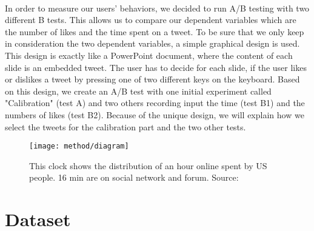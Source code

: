\paragraph{}
In order to measure our users' behaviors, we decided to run A/B testing with two different B tests. This allows us to compare our dependent variables which are the number of likes and the time spent on a tweet. To be sure that we only keep in consideration the two dependent variables, a simple graphical design is used. This design is exactly like a PowerPoint document, where the content of each slide is an embedded tweet. The user has to decide for each slide, if the user likes or dislikes a tweet by pressing one of two different keys on the keyboard. Based on this design, we create an A/B test with one initial experiment called "Calibration" (test A) and two others recording input the time (test B1) and the numbers of likes (test B2). Because of the unique design, we will explain how we select the tweets for the calibration part and the two other tests.\\

\begin{figure}[h] 
\centering 
\texttt{[image: method/diagram]} 
\caption[Time spent of Social Media]{This clock shows the distribution of an hour online spent by US people. 16 min are on social network and forum. Source: \cite{s_clock}}
\label{fig:clock1} 
\end{figure}


\section{Dataset}

